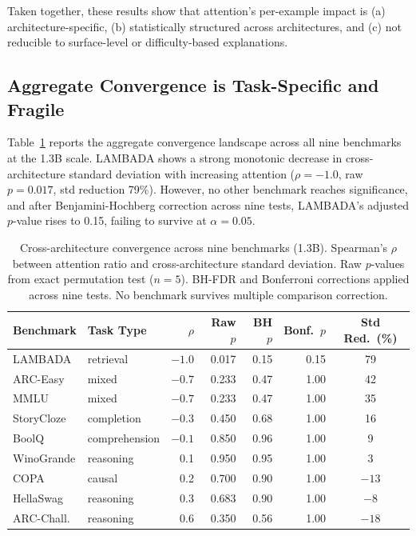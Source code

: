 \documentclass[11pt,a4paper]{article}
\begin{document}
Taken together, these results show that attention's per-example impact is (a) architecture-specific, (b) statistically structured across architectures, and (c) not reducible to surface-level or difficulty-based explanations.

\subsection{Aggregate Convergence is Task-Specific and Fragile}
\label{sec:convergence}

Table~\ref{tab:convergence} reports the aggregate convergence landscape across all nine benchmarks at the 1.3B scale. LAMBADA shows a strong monotonic decrease in cross-architecture standard deviation with increasing attention ($\rho = -1.0$, raw $p = 0.017$, std reduction 79\%). However, no other benchmark reaches significance, and after Benjamini-Hochberg correction \citep{benjamini1995controlling} across nine tests, LAMBADA's adjusted $p$-value rises to 0.15, failing to survive at $\alpha = 0.05$.

\begin{table}[t]
\centering
\caption{Cross-architecture convergence across nine benchmarks (1.3B). Spearman's $\rho$ between attention ratio and cross-architecture standard deviation. Raw $p$-values from exact permutation test ($n = 5$). BH-FDR and Bonferroni corrections applied across nine tests. No benchmark survives multiple comparison correction.}
\label{tab:convergence}
\small
\begin{tabular}{llrrrrc}
\toprule
\textbf{Benchmark} & \textbf{Task Type} & $\rho$ & \textbf{Raw $p$} & \textbf{BH $p$} & \textbf{Bonf.\ $p$} & \textbf{Std Red.\ (\%)} \\
\midrule
LAMBADA & retrieval & $-1.0$ & 0.017 & 0.15 & 0.15 & 79 \\
ARC-Easy & mixed & $-0.7$ & 0.233 & 0.47 & 1.00 & 42 \\
MMLU & mixed & $-0.7$ & 0.233 & 0.47 & 1.00 & 35 \\
StoryCloze & completion & $-0.3$ & 0.450 & 0.68 & 1.00 & 16 \\
BoolQ & comprehension & $-0.1$ & 0.850 & 0.96 & 1.00 & 9 \\
WinoGrande & reasoning & 0.1 & 0.950 & 0.95 & 1.00 & 3 \\
COPA & causal & 0.2 & 0.700 & 0.90 & 1.00 & $-13$ \\
HellaSwag & reasoning & 0.3 & 0.683 & 0.90 & 1.00 & $-8$ \\
ARC-Chall. & reasoning & 0.6 & 0.350 & 0.56 & 1.00 & $-18$ \\
\bottomrule
\end{tabular}
\end{table}
\end{document}
